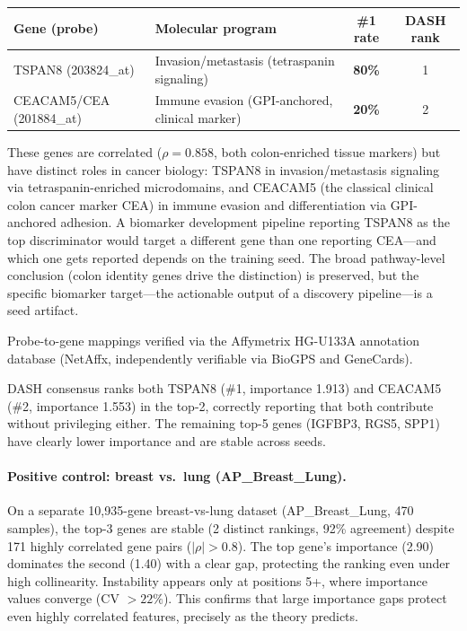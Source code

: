 \documentclass{article}
\begin{document}
\begin{center}
\small
\begin{tabular}{@{}llcc@{}}
\toprule
Gene (probe) & Molecular program & \#1 rate & DASH rank \\
\midrule
TSPAN8 (203824\_at) & Invasion/metastasis (tetraspanin signaling) & \textbf{80\%} & 1 \\
CEACAM5/CEA (201884\_at) & Immune evasion (GPI-anchored, clinical marker) & \textbf{20\%} & 2 \\
\bottomrule
\end{tabular}
\end{center}

These genes are correlated ($\rho = 0.858$, both colon-enriched tissue markers) but have distinct roles in cancer biology: TSPAN8 in invasion/metastasis signaling via tetraspanin-enriched microdomains, and CEACAM5 (the classical clinical colon cancer marker CEA) in immune evasion and differentiation via GPI-anchored adhesion. A biomarker development pipeline reporting TSPAN8 as the top discriminator would target a different gene than one reporting CEA---and which one gets reported depends on the training seed. The broad pathway-level conclusion (colon identity genes drive the distinction) is preserved, but the specific biomarker target---the actionable output of a discovery pipeline---is a seed artifact.

Probe-to-gene mappings verified via the Affymetrix HG-U133A annotation database (NetAffx, independently verifiable via BioGPS and GeneCards).

DASH consensus ranks both TSPAN8 (\#1, importance 1.913) and CEACAM5 (\#2, importance 1.553) in the top-2, correctly reporting that both contribute without privileging either. The remaining top-5 genes (IGFBP3, RGS5, SPP1) have clearly lower importance and are stable across seeds.

\paragraph{Positive control: breast vs.\ lung (AP\_Breast\_Lung).}
On a separate 10{,}935-gene breast-vs-lung dataset (AP\_Breast\_Lung, 470 samples), the top-3 genes are stable (2 distinct rankings, 92\% agreement) despite 171 highly correlated gene pairs ($|\rho| > 0.8$). The top gene's importance (2.90) dominates the second (1.40) with a clear gap, protecting the ranking even under high collinearity. Instability appears only at positions 5+, where importance values converge (CV $> 22\%$). This confirms that large importance gaps protect even highly correlated features, precisely as the theory predicts.
\end{document}
